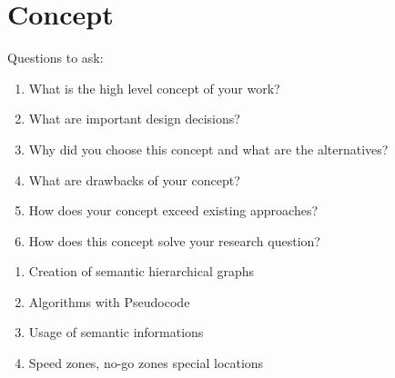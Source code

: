 \chapter{Concept}
\label{sec:concept}
Questions to ask:
\begin{enumerate}
    \item What is the high level concept of your work?
    \item What are important design decisions?
    \item Why did you choose this concept and what are the alternatives?
    \item What are drawbacks of your concept?
    \item How does your concept exceed existing approaches?
    \item How does this concept solve your research question?
\end{enumerate}

\begin{enumerate}
    \item Creation of semantic hierarchical graphs
    \item Algorithms with Pseudocode
    \item Usage of semantic informations
    \item Speed zones, no-go zones special locations
\end{enumerate}